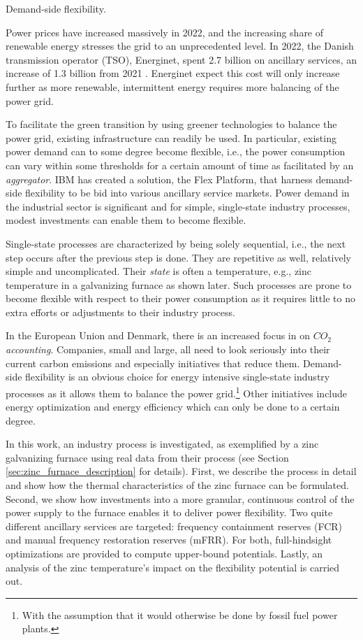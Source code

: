 \documentclass[lettersize,journal]{IEEEtran}
\begin{document}
\begin{IEEEkeywords}
    Demand-side flexibility.
\end{IEEEkeywords}



Power prices have increased massively in 2022, and the increasing share of renewable energy stresses the grid to an unprecedented level. In 2022, the Danish transmission operator (TSO), Energinet, spent 2.7 billion on ancillary services, an increase of 1.3 billion from 2021 \cite{energinetOmkostninger}. Energinet expect this cost will only increase further as more renewable, intermittent energy requires more balancing of the power grid.

To facilitate the green transition by using greener technologies to balance the power grid, existing infrastructure can readily be used. In particular, existing power demand can to some degree become flexible, i.e., the power consumption can vary within some thresholds for a certain amount of time as facilitated by an \textit{aggregator}. IBM has created a solution, the Flex Platform, that harness demand-side flexibility to be bid into various ancillary service markets. Power demand in the industrial sector is significant and for simple, single-state industry processes, modest investments can enable them to become flexible.

Single-state processes are characterized by being solely sequential, i.e., the next step occurs after the previous step is done. They are repetitive as well, relatively simple and uncomplicated. Their \textit{state} is often a temperature, e.g., zinc temperature in a galvanizing furnace as shown later. Such processes are prone to become flexible with respect to their power consumption as it requires little to no extra efforts or adjustments to their industry process.

In the European Union and Denmark, there is an increased focus in on $CO_{2}$ \textit{accounting}. Companies, small and large, all need to look seriously into their current carbon emissions and especially initiatives that reduce them. Demand-side flexibility is an obvious choice for energy intensive single-state industry processes as it allows them to balance the power grid.\footnote{With the assumption that it would otherwise be done by fossil fuel power plants.} Other initiatives include energy optimization and energy efficiency which can only be done to a certain degree.

In this work, an industry process is investigated, as exemplified by a zinc galvanizing furnace using real data from their process (see Section \ref{sec:zinc_furnace_description} for details). First, we describe the process in detail and show how the thermal characteristics of the zinc furnace can be formulated. Second, we show how investments into a more granular, continuous control of the power supply to the furnace enables it to deliver power flexibility. Two quite different ancillary services are targeted: frequency containment reserves (FCR) and manual frequency restoration reserves (mFRR). For both, full-hindsight optimizations are provided to compute upper-bound potentials. Lastly, an analysis of the zinc temperature's impact on the flexibility potential is carried out.
\end{document}
